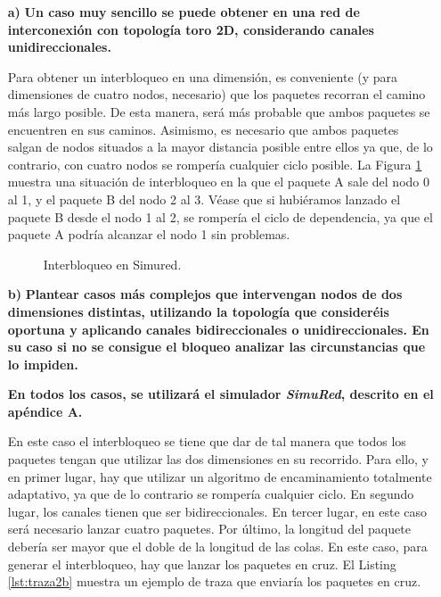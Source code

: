 \begin{itemize}
    \item[\textbf{a)}] \textbf{Un caso muy sencillo se puede obtener en una red de interconexión con topología toro 2D, considerando canales unidireccionales.}

    Para obtener un interbloqueo en una dimensión, es conveniente (y para dimensiones de cuatro nodos, necesario) que los paquetes recorran el camino más largo posible. De esta manera, será más probable que ambos paquetes se encuentren en sus caminos. Asimismo, es necesario que ambos paquetes salgan de nodos situados a la mayor distancia posible entre ellos ya que, de lo contrario, con cuatro nodos se rompería cualquier ciclo posible. La Figura \ref{fig:interbloqueo-simured} muestra una situación de interbloqueo en la que el paquete A sale del nodo 0 al 1, y el paquete B del nodo 2 al 3. Véase que si hubiéramos lanzado el paquete B desde el nodo 1 al 2, se rompería el ciclo de dependencia, ya que el paquete A podría alcanzar el nodo 1 sin problemas.

    \begin{figure}[h] %
      \centering
      \caption{Interbloqueo en Simured.}
      \label{fig:interbloqueo-simured}
    \end{figure}

    \item[\textbf{b)}] \textbf{Plantear casos más complejos que intervengan nodos de dos dimensiones distintas, utilizando la topología que consideréis oportuna y aplicando canales bidireccionales o unidireccionales. En su caso si no se consigue el bloqueo analizar las circunstancias que lo impiden.}\par
    \textbf{En todos los casos, se utilizará el simulador \emph{SimuRed}, descrito en el apéndice A.}

    En este caso el interbloqueo se tiene que dar de tal manera que todos los paquetes tengan que utilizar las dos dimensiones en su recorrido. Para ello, y en primer lugar, hay que utilizar un algoritmo de encaminamiento totalmente adaptativo, ya que de lo contrario se rompería cualquier ciclo. En segundo lugar, los canales tienen que ser bidireccionales. En tercer lugar, en este caso será necesario lanzar cuatro paquetes. Por último, la longitud del paquete debería ser mayor que el doble de la longitud de las colas. En este caso, para generar el interbloqueo, hay que lanzar los paquetes en cruz. El Listing \ref{lst:traza2b} muestra un ejemplo de traza que enviaría los paquetes en cruz. 


\end{itemize}
